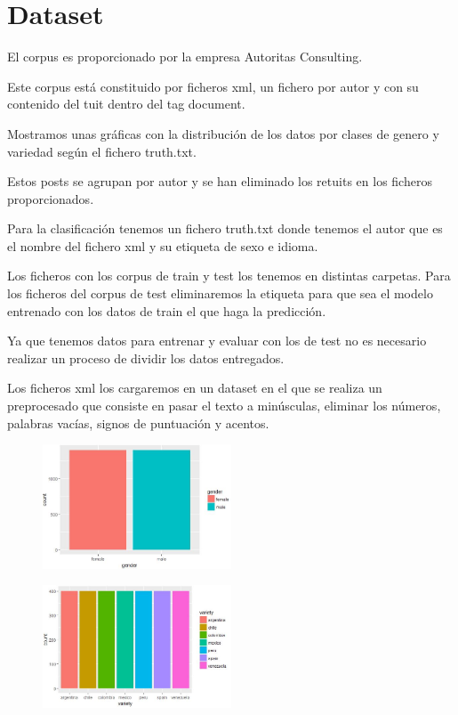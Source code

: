 \documentclass[11pt,a4paper]{article}
\begin{document}
\section{Dataset}
\justify
El corpus es proporcionado por la empresa Autoritas Consulting. \par\noindent
Este corpus est\'a constituido por ficheros xml, un fichero por autor y con su contenido del tuit dentro del tag document.\par\noindent
Mostramos unas gr\'aficas con la distribuci\'on de los datos por clases de genero y variedad seg\'un el fichero truth.txt.\par\noindent
Estos posts se agrupan por autor y se han eliminado los retuits en los ficheros proporcionados. \par\noindent
Para la clasificaci\'on tenemos un fichero truth.txt donde tenemos el autor que es el nombre del fichero xml y su etiqueta de sexo e idioma. \par\noindent
Los ficheros con los corpus de train y test los tenemos en distintas carpetas. Para los ficheros del corpus de test eliminaremos la etiqueta para que sea el modelo entrenado con los datos de train el que haga la predicción.\par\noindent
Ya que tenemos datos para entrenar y evaluar con los de test no es necesario realizar un proceso de dividir los datos entregados. \par\noindent
Los ficheros xml los cargaremos en un dataset en el que se realiza un preprocesado que consiste en pasar el texto a min\'usculas, eliminar los n\'umeros, palabras vac\'ias, signos de puntuaci\'on y acentos.
\par\noindent
\begin{figure}
    \includegraphics[width=0.5\textwidth]{GraficoGender}
\end{figure}

\begin{figure}
    \includegraphics[width=0.5\textwidth]{variety}
\end{figure}
\end{document}
